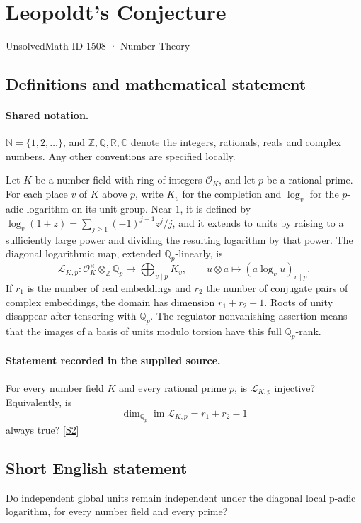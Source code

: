 \documentclass[11pt]{article}
\newcommand{\sref}[2]{\hyperlink{source:#1:#2}{[S#2]}}
\begin{document}
\setcounter{section}{1507}
\section{Leopoldt's Conjecture}\label{1508}
{\small\sffamily UnsolvedMath ID 1508 · Number Theory}
\subsection{Definitions and mathematical statement}

\paragraph{Shared notation.}$\mathbb N=\{1,2,\ldots\}$, and $\mathbb Z,\mathbb Q,\mathbb R,\mathbb C$ denote the integers, rationals, reals and complex numbers. Any other conventions are specified locally.


Let \(K\) be a number field with ring of integers \(\mathcal O_K\),
and let \(p\) be a rational prime. For each place \(v\) of \(K\)
above \(p\), write \(K_v\) for the completion and \(\log_v\)
for the \(p\)-adic logarithm on its unit group. Near \(1\), it is
defined by \(\log_v(1+z)=\sum_{j\ge1}(-1)^{j+1}z^j/j\), and
it extends to units by raising to a sufficiently large power and
dividing the resulting logarithm by that power.
The diagonal logarithmic map, extended \(\mathbb Q_p\)-linearly, is
\[
 \mathcal L_{K,p}:\mathcal O_K^\times\otimes_{\mathbb Z}\mathbb Q_p
       \longrightarrow\bigoplus_{v\mid p}K_v,
 \qquad u\otimes a\longmapsto(a\log_v u)_{v\mid p}.
\]
If \(r_1\) is the number of real embeddings and \(r_2\) the number
of conjugate pairs of complex embeddings, the domain has dimension
\(r_1+r_2-1\). Roots of unity disappear after tensoring with \(\mathbb Q_p\).
The regulator nonvanishing assertion means that the images of a
basis of units modulo torsion have this full \(\mathbb Q_p\)-rank.
\paragraph{Statement recorded in the supplied source.}
For every number field \(K\) and every rational prime \(p\),
is \(\mathcal L_{K,p}\) injective? Equivalently, is
\[
 \dim_{\mathbb Q_p}\operatorname{im}\mathcal L_{K,p}=r_1+r_2-1
\]
always true? \sref{1508}{2}
\subsection{Short English statement}
Do independent global units remain independent under the diagonal local p-adic logarithm, for every number field and every prime?
\end{document}
